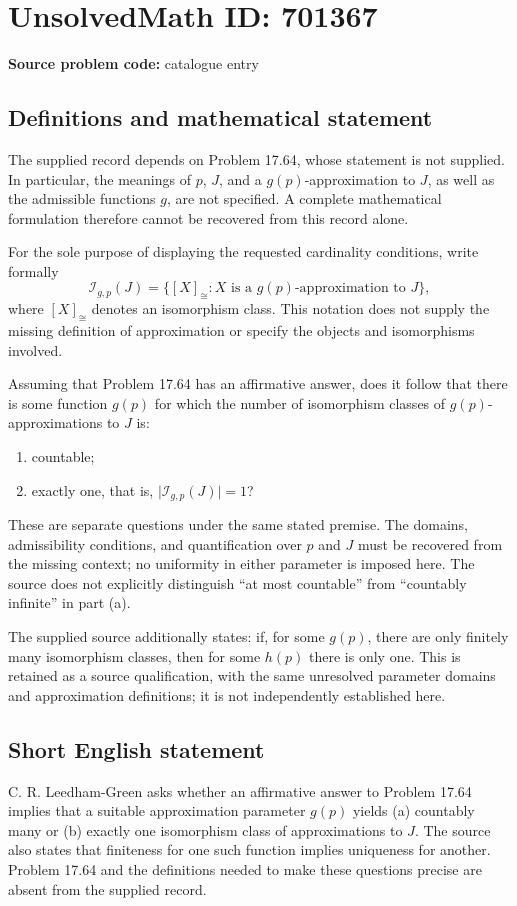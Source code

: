 \documentclass[11pt]{article}
\begin{document}
\section*{UnsolvedMath ID: 701367}
\textbf{Source problem code:} catalogue entry
\subsection{Definitions and mathematical statement}
The supplied record depends on Problem 17.64, whose statement is not supplied. In particular, the meanings of \(p\), \(J\), and a \(g(p)\)-approximation to \(J\), as well as the admissible functions \(g\), are not specified. A complete mathematical formulation therefore cannot be recovered from this record alone.

For the sole purpose of displaying the requested cardinality conditions, write formally
\[
\mathcal I_{g,p}(J)=\{[X]_{\cong}:X\text{ is a }g(p)\text{-approximation to }J\},
\]
where \([X]_{\cong}\) denotes an isomorphism class. This notation does not supply the missing definition of approximation or specify the objects and isomorphisms involved.

Assuming that Problem 17.64 has an affirmative answer, does it follow that there is some function \(g(p)\) for which the number of isomorphism classes of \(g(p)\)-approximations to \(J\) is:
\begin{enumerate}
\item[(a)] countable;
\item[(b)] exactly one, that is, \(\lvert\mathcal I_{g,p}(J)\rvert=1\)?
\end{enumerate}
These are separate questions under the same stated premise. The domains, admissibility conditions, and quantification over \(p\) and \(J\) must be recovered from the missing context; no uniformity in either parameter is imposed here. The source does not explicitly distinguish ``at most countable'' from ``countably infinite'' in part (a).

The supplied source additionally states: if, for some \(g(p)\), there are only finitely many isomorphism classes, then for some \(h(p)\) there is only one. This is retained as a source qualification, with the same unresolved parameter domains and approximation definitions; it is not independently established here.
\subsection{Short English statement}
C. R. Leedham-Green asks whether an affirmative answer to Problem 17.64 implies that a suitable approximation parameter \(g(p)\) yields (a) countably many or (b) exactly one isomorphism class of approximations to \(J\). The source also states that finiteness for one such function implies uniqueness for another. Problem 17.64 and the definitions needed to make these questions precise are absent from the supplied record.
\end{document}
